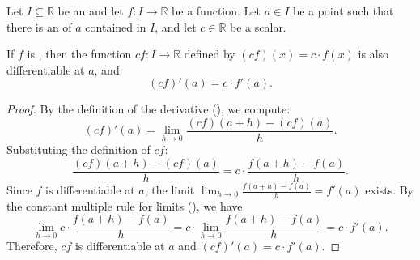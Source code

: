 \begin{corollary} \label{corollary:derivative_of_real_scalar_multiple_of_real_valued_differentiable_function_on_real_interval_at_a_point_is_scalar_multiple_of_derivative}
    Let $I \subseteq \mathbb{R}$ be an  and let $f : I \to \mathbb{R}$ be a function. Let $a \in I$ be a point such that there is an  of $a$ contained in $I$, and let $c \in \mathbb{R}$ be a scalar.

    If $f$ is , then the function $cf : I \to \mathbb{R}$ defined by $(cf)(x) = c \cdot f(x)$ is also differentiable at $a$, and
    $$(cf)'(a) = c \cdot f'(a).$$
\end{corollary}
\begin{proof}
    By the definition of the derivative (), we compute:
    $$ (cf)'(a) = \lim_{h \to 0} \frac{(cf)(a+h) - (cf)(a)}{h}. $$
    Substituting the definition of $cf$:
    $$\frac{(cf)(a+h) - (cf)(a)}{h} = c \cdot \frac{f(a+h) - f(a)}{h}.$$
    Since $f$ is differentiable at $a$, the limit $\lim_{h \to 0} \frac{f(a+h) - f(a)}{h} = f'(a)$ exists. By the constant multiple rule for limits (), we have
    $$\lim_{h \to 0} c \cdot \frac{f(a+h) - f(a)}{h} = c \cdot \lim_{h \to 0} \frac{f(a+h) - f(a)}{h} = c \cdot f'(a).$$
    Therefore, $cf$ is differentiable at $a$ and $(cf)'(a) = c \cdot f'(a)$.
\end{proof}
